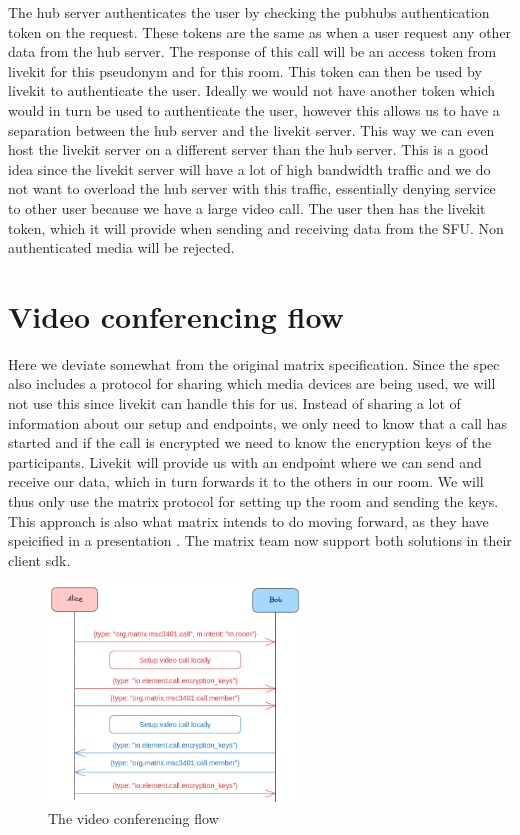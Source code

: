 \documentclass{report}
\begin{document}
    The hub server authenticates the user by checking the pubhubs authentication token on the request. These tokens are
    the same as when a user request any other data from the hub server. The response of this call will be an
    access token from livekit for this pseudonym and for this room. This token can then be used by livekit to
    authenticate the user. Ideally we would not have another token which would in turn be used to authenticate the
    user, however this allows us to have a separation between the hub server and the livekit server. This way we can
    even host the livekit server on a different server than the hub server. This is a good idea since the
    livekit server will have a lot of high bandwidth traffic and we do not want to overload the hub server with
    this traffic, essentially denying service to other user because we have a large video call. The user then
    has the livekit token, which it will provide when sending and receiving data from the SFU. Non authenticated
    media will be rejected.

    \section{Video conferencing flow}
    Here we deviate somewhat from the original matrix specification. Since the spec also includes a protocol for
    sharing which media devices are being used, we will not use this since livekit can handle this for us. Instead
    of sharing a lot of information about our setup and endpoints, we only need to know that a call has started and
    if the call is encrypted we need to know the encryption keys of the participants. Livekit will provide us with
    an endpoint where we can send and receive our data, which in turn forwards it to the others in our room. We
    will thus only use the matrix protocol for setting up the room and sending the keys. This approach is also what
    matrix intends to do moving forward, as they have speicified in a presentation . The
    matrix team now support both solutions in their client sdk.

    \begin{figure}
        \centering
        \includegraphics[width=0.6\textwidth]{img/Callflow.excalidraw.png}
        \caption{The video conferencing flow}
        \label{fig:video-conference-flow}
    \end{figure}
\end{document}
